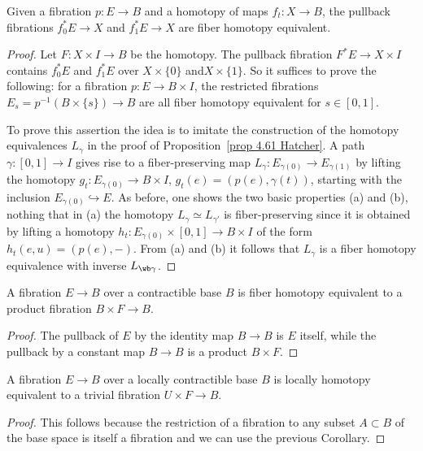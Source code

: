 \begin{prop}
    Given a fibration $p:E\to B$ and a homotopy of maps $f_t:X\to B$, the pullback fibrations $f^\ast_0E\to X$ and $f^\ast_1E\to X$ are fiber homotopy equivalent.
\end{prop}
\begin{proof}
    Let $F:X\times I\to B$ be the homotopy. The pullback fibration $F^\ast E\to X\times I$ contains $f^\ast_0E$ and $f^\ast_1E$ over $X\times\{0\}$ and$X\times\{1\}$. So it suffices to prove the following: for a fibration $p:E\to B\times I$, the restricted fibrations $E_s=p^{-1}(B\times\{s\})\to B$ are all fiber homotopy equivalent for $s\in [0,1]$.

    To prove this assertion the idea is to imitate the construction of the homotopy equivalences $L_\gamma$ in the proof of Proposition~\ref{prop 4.61 Hatcher}. A path $\gamma:[0,1]\to I$ gives rise to a fiber-preserving map $L_\gamma:E_{\gamma(0)}\to E_{\gamma(1)}$ by lifting the homotopy $g_t:E_{\gamma(0)}\to B\times I$, $g_t(e)=(p(e),\gamma(t))$, starting with the inclusion $E_{\gamma(0)}\hookrightarrow E$. As before, one shows the two basic properties (a) and (b), nothing that in (a) the homotopy $L_\gamma\simeq  L_{\gamma'}$ is fiber-preserving since it is obtained by lifting a homotopy $h_t:E_{\gamma(0)}\times [0,1]\to B\times I$ of the form $h_t(e,u)=(p(e),-)$. From (a) and (b) it follows that $L_\gamma$ is a fiber homotopy equivalence with inverse $L_{\wb\gamma}$.
\end{proof}
\begin{cor}
    A fibration $E\to B$ over a contractible base $B$ is fiber homotopy equivalent to a product fibration $B\times F\to B$.
\end{cor}
\begin{proof}
    The pullback of $E$ by the identity map $B\to B$ is $E$ itself, while the pullback by a constant map $B\to B$ is a product $B\times F$.
\end{proof}
\begin{cor}\label{cor 4.63 Hatcher}
    A fibration $E\to B$ over a locally contractible base $B$ is locally homotopy equivalent to a trivial fibration $U\times F\to B$.
\end{cor}
\begin{proof}
    This follows because the restriction of a fibration to any subset $A\subset B$ of the base space is itself a fibration and we can use the previous Corollary.
\end{proof}



